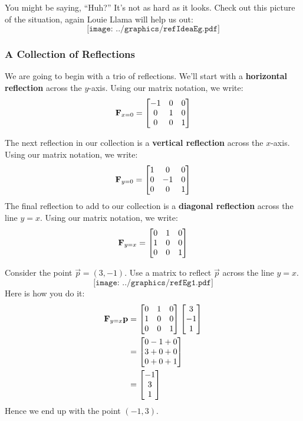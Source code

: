 You might be saying, ``Huh?''  It's not as hard as it looks.  Check
out this picture of the situation, again Louie Llama 
will help us out:
\[
\texttt{[image: ../graphics/refIdeaEg.pdf]}
\]

\subsubsection{A Collection of Reflections}

We are going to begin with a trio of reflections. We'll start with a
\textbf{horizontal reflection} across the $y$-axis.  Using
our matrix notation, we write:
\[
\mathbf{F}_{x=0} =
\begin{bmatrix}
-1 & 0 & 0\\
 0 & 1 & 0\\
 0 & 0 & 1
\end{bmatrix}
\]

The next reflection in our collection is a \textbf{vertical
  reflection}
across the $x$-axis.  Using our matrix notation, we write:
\[
\mathbf{F}_{y=0} =
\begin{bmatrix}
1 &  0 & 0\\
0 & -1 & 0\\
0 &  0 & 1
\end{bmatrix}
\]
The final reflection to add to our collection is a \textbf{diagonal
  reflection}
across the line $y=x$.  Using our matrix notation, we write:
\[
\mathbf{F}_{y=x} =
\begin{bmatrix}
0 & 1 & 0\\
1 & 0 & 0\\
0 & 0 & 1
\end{bmatrix}
\]


\begin{example}
Consider the point $\vec{p} =(3,-1)$.  Use a matrix to reflect
$\vec{p}$ across the line $y = x$.
\[
\texttt{[image: ../graphics/refEg1.pdf]}
\]
Here is how you do it:
\begin{align*}
\mathbf{F}_{y = x} \mathbf{p} &= 
\begin{bmatrix}
0 & 1 & 0 \\ 
1 & 0 & 0 \\
0 & 0 & 1
\end{bmatrix}
\begin{bmatrix}
3 \\
-1 \\
1
\end{bmatrix}\\
&=
\begin{bmatrix}
0-1+0\\
3+0+0 \\
0+0+1
\end{bmatrix}\\
&=
\begin{bmatrix}
-1\\
3 \\
1
\end{bmatrix}
\end{align*}
Hence we end up with the point $(-1,3)$. 
\end{example}

